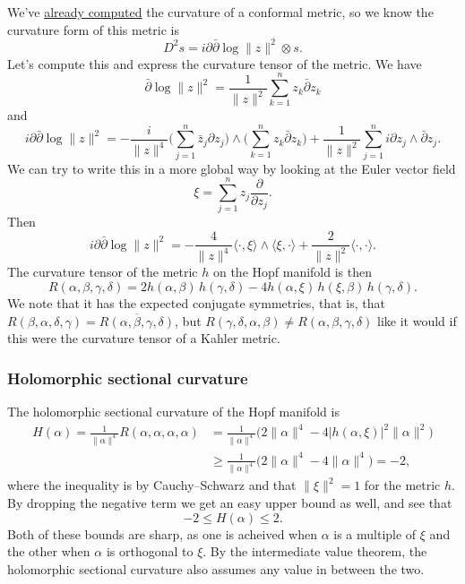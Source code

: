 \documentclass[11pt]{article}
\begin{document}
We've \hyperref[sec:org65fcbad]{already computed} the curvature of a conformal metric, so we know the curvature form of this metric is
$$
D^2 s = i\partial\bar\partial \log \|z\|^2 \otimes s.
$$
Let's compute this and express the curvature tensor of the metric. We have
$$
\bar\partial \log \|z\|^2
= \frac{1}{\|z\|^2} \sum_{k=1}^n z_k \bar\partial z_k
$$
and
$$
i\partial\bar\partial \log \|z\|^2
= - \frac{i}{\|z\|^4} \biggl(\sum_{j=1}^n \bar z_j \partial z_j \biggr) \wedge \biggl(\sum_{k=1}^n z_k \bar\partial z_k\biggr) + \frac{1}{\|z\|^2} \sum_{j=1}^n i\partial z_j \wedge \bar\partial z_j.
$$
We can try to write this in a more global way by looking at the Euler vector field
$$
\xi = \sum_{j=1}^n z_j \frac{\partial}{\partial z_j}.
$$
Then
$$
i\partial\bar\partial \log \|z\|^2
= -\frac{4}{\|z\|^4} \langle \cdot, \xi \rangle \wedge \langle \xi, \cdot \rangle + \frac{2}{\|z\|^2} \langle \cdot, \cdot \rangle.
$$
The curvature tensor of the metric \(h\) on the Hopf manifold is then
$$
R(\alpha,\beta,\gamma,\delta)
= 2 h(\alpha, \beta)\,h(\gamma, \delta) - 4 h(\alpha, \xi)\, h(\xi, \beta)\,h(\gamma, \delta).
$$
We note that it has the expected conjugate symmetries, that is, that \(R(\beta, \alpha, \delta, \gamma) = \overline{R(\alpha, \beta, \gamma, \delta)}\), but \(R(\gamma, \delta, \alpha, \beta) \not= R(\alpha, \beta, \gamma, \delta)\) like it would if this were the curvature tensor of a Kahler metric.


\subsubsection{Holomorphic sectional curvature}
\label{sec:org6471503}

The holomorphic sectional curvature of the Hopf manifold is
\begin{align*}
H(\alpha)
= \frac{1}{\|\alpha\|^4} R(\alpha, \alpha, \alpha, \alpha)
&= \frac{1}{\|\alpha\|^4} \bigl( 2 \|\alpha\|^4 - 4 |h(\alpha, \xi)|^2 \|\alpha\|^2 \bigr)
\\
&\geq \frac{1}{\|\alpha\|^4}\bigl( 2 \|\alpha\|^4 - 4 \|\alpha\|^4\bigr)
= -2,
\end{align*}
where the inequality is by Cauchy--Schwarz and that \(\|\xi\|^2 = 1\) for the metric \(h\). By dropping the negative term we get an easy upper bound as well, and see that
$$
-2 \leq H(\alpha) \leq 2.
$$
Both of these bounds are sharp, as one is acheived when \(\alpha\) is a multiple of \(\xi\) and the other when \(\alpha\) is orthogonal to \(\xi\). By the intermediate value theorem, the holomorphic sectional curvature also assumes any value in between the two.
\end{document}
